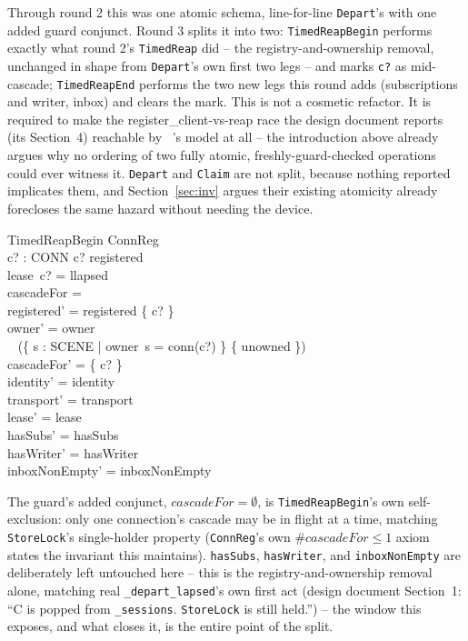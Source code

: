 \documentclass[a4paper,10pt,fleqn]{article}
\begin{document}
Through round 2 this was one atomic schema, line-for-line \texttt{Depart}'s
with one added guard conjunct. Round 3 splits it into two:
\texttt{TimedReapBegin} performs exactly what round 2's \texttt{TimedReap}
did -- the registry-and-ownership removal, unchanged in shape from
\texttt{Depart}'s own first two legs -- and marks \texttt{c?} as
mid-cascade; \texttt{TimedReapEnd} performs the two new legs this round
adds (subscriptions and writer, inbox) and clears the mark. This is not a
cosmetic refactor. It is required to make the register\_client-vs-reap
race the design document reports (its Section~4) reachable by \fuzz\ 's
model at all -- the introduction above already argues why no ordering of
two fully atomic, freshly-guard-checked operations could ever witness it.
\texttt{Depart} and \texttt{Claim} are not split, because nothing reported
implicates them, and Section~\ref{sec:inv} argues their existing atomicity
already forecloses the same hazard without needing the device.

\begin{schema}{TimedReapBegin}
  \Delta ConnReg \\
  c? : CONN
\where
  c? \in registered \\
  lease~c? = llapsed \\
  cascadeFor = \emptyset \\
  registered' = registered \setminus \{ c? \} \\
  owner' = owner \oplus \\
  \quad~ (\{ s : SCENE | owner~s = conn(c?) \} \cross \{ unowned \}) \\
  cascadeFor' = \{ c? \} \\
  identity' = identity \\
  transport' = transport \\
  lease' = lease \\
  hasSubs' = hasSubs \\
  hasWriter' = hasWriter \\
  inboxNonEmpty' = inboxNonEmpty
\end{schema}

The guard's added conjunct, \texttt{$cascadeFor = \emptyset$}, is
\texttt{TimedReapBegin}'s own self-exclusion: only one connection's cascade
may be in flight at a time, matching \texttt{StoreLock}'s single-holder
property (\texttt{ConnReg}'s own \texttt{$\#cascadeFor \leq 1$} axiom
states the invariant this maintains). \texttt{hasSubs}, \texttt{hasWriter},
and \texttt{inboxNonEmpty} are deliberately left untouched here -- this is
the registry-and-ownership removal alone, matching real
\texttt{\_depart\_lapsed}'s own first act (design document Section~1: ``C is
popped from \texttt{\_sessions}. \texttt{StoreLock} is still held.'') --
the window this exposes, and what closes it, is the entire point of the
split.
\end{document}
